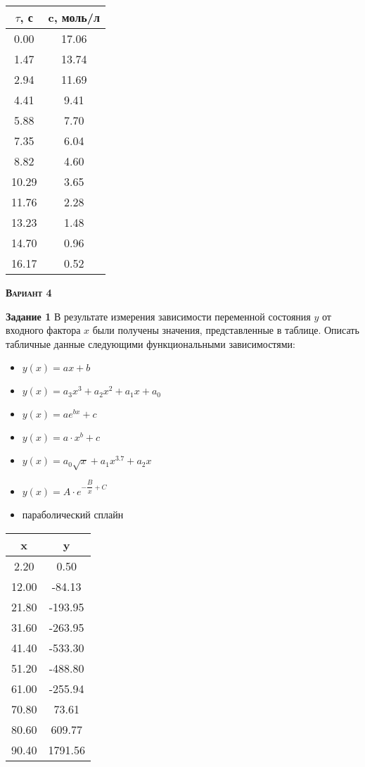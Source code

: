 \begin{table}[h]
\begin{tabular}{|c|c|}
\hline
$\tau$, с & c, моль/л \\ \hline
 0.00 &      17.06 \\ \hline 
 1.47 &      13.74 \\ \hline 
 2.94 &      11.69 \\ \hline 
 4.41 &       9.41 \\ \hline 
 5.88 &       7.70 \\ \hline 
 7.35 &       6.04 \\ \hline 
 8.82 &       4.60 \\ \hline 
10.29 &       3.65 \\ \hline 
11.76 &       2.28 \\ \hline 
13.23 &       1.48 \\ \hline 
14.70 &       0.96 \\ \hline 
16.17 &       0.52 \\ \hline 
\end{tabular}
\end{table}

\newpage

\textsc{\textbf{Вариант 4}}

\textbf{Задание 1} В результате измерения зависимости переменной состояния $y$ от входного фактора $x$ были получены значения, представленные в таблице. Описать табличные данные следующими функциональными зависимостями:
 \begin{itemize} 
\item $y(x)=a x+b$
\item $y(x)=a_3 x^3 +a_2 x^2 + a_1 x +a_0$
\item $y(x)=a e^{b x}+c  $
\item $y(x)=a \cdot x^b+c$
\item $y(x)=a_0 \sqrt{x}              +a_1 x^{3.7}                +a_2 x                     $
\item $y(x)=A \cdot e^{-\dfrac{B}{x}+C}        $
\item параболический сплайн
\end{itemize}
\begin{table}[h]
\begin{tabular}{|c|c|}
\hline
x & y \\ \hline
 2.20 &       0.50 \\ \hline 
12.00 &     -84.13 \\ \hline 
21.80 &    -193.95 \\ \hline 
31.60 &    -263.95 \\ \hline 
41.40 &    -533.30 \\ \hline 
51.20 &    -488.80 \\ \hline 
61.00 &    -255.94 \\ \hline 
70.80 &      73.61 \\ \hline 
80.60 &     609.77 \\ \hline 
90.40 &    1791.56 \\ \hline 
\end{tabular}
\end{table}

